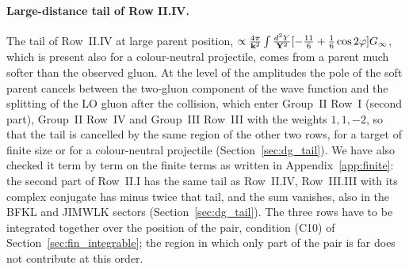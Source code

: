 \paragraph{Large-distance tail of Row II.IV.} The tail of Row~II.IV at large parent position, $\propto\frac{4\pi}{\mathbf{k}^2}\int\frac{d^2Y}{\mathbf{Y}^2}[-\frac{11}{6}+\frac16\cos2\varphi]G_\infty$, which is present also for a colour-neutral projectile, comes from a parent much softer than the observed gluon. At the level of the amplitudes the pole of the soft parent cancels between the two-gluon component of the wave function and the splitting of the LO gluon after the collision, which enter Group~II Row~I (second part), Group~II Row~IV and Group~III Row~III with the weights $1,1,-2$, so that the tail is cancelled by the same region of the other two rows, for a target of finite size or for a colour-neutral projectile (Section~\ref{sec:dg_tail}). We have also checked it term by term on the finite terms as written in Appendix~\ref{app:finite}: the second part of Row~II.I has the same tail as Row~II.IV, Row~III.III with its complex conjugate has minus twice that tail, and the sum vanishes, also in the BFKL and JIMWLK sectors (Section~\ref{sec:dg_tail}). The three rows have to be integrated together over the position of the pair, condition (C10) of Section~\ref{sec:fin_integrable}; the region in which only part of the pair is far does not contribute at this order.
